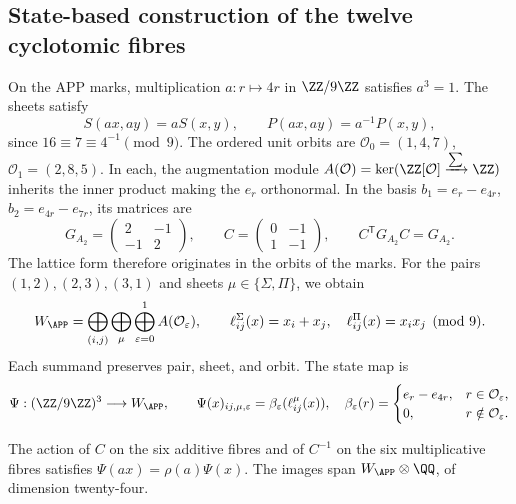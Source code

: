 \subsection{State-based construction of the twelve cyclotomic fibres}
\label{x_reciprocidad:nuclear:fibras-app-witt}
On the APP marks, multiplication \(a:r\mapsto4r\) in
\(\ZZ/9\ZZ\) satisfies \(a^3=1\). The sheets satisfy
\[
 S(ax,ay)=aS(x,y),\qquad P(ax,ay)=a^{-1}P(x,y),
\]
since \(16\equiv7\equiv4^{-1}\pmod9\). The ordered unit orbits
are \(\mathcal O_0=(1,4,7)\), \(\mathcal O_1=(2,8,5)\).
In each, the augmentation module
\(A(\mathcal O)=\ker(\ZZ[\mathcal O]\xrightarrow{\sum}\ZZ)\)
inherits the inner product making the \(e_r\) orthonormal. In the basis
\(b_1=e_r-e_{4r}\), \(b_2=e_{4r}-e_{7r}\), its matrices are
\[
 G_{A_2}=\begin{pmatrix}2&-1\\-1&2\end{pmatrix},\qquad
 C=\begin{pmatrix}0&-1\\1&-1\end{pmatrix},\qquad
 C^{\mathsf T}G_{A_2}C=G_{A_2}.
\]
The lattice form therefore originates in the orbits of the marks.
For the pairs \((1,2),(2,3),(3,1)\) and sheets
\(\mu\in\{\Sigma,\Pi\}\), we obtain
\[
 W_{\APP}=\bigoplus_{(i,j)}\bigoplus_\mu\bigoplus_{\varepsilon=0}^1
 A(\mathcal O_\varepsilon),\qquad
 \ell^\Sigma_{ij}(x)=x_i+x_j,\quad
 \ell^\Pi_{ij}(x)=x_ix_j\pmod9.
\]
Each summand preserves pair, sheet, and orbit. The state map is
\[
 \Psi:(\ZZ/9\ZZ)^3\longrightarrow W_{\APP},\qquad
 \Psi(x)_{ij,\mu,\varepsilon}=\beta_\varepsilon(\ell^\mu_{ij}(x)),
 \quad
 \beta_\varepsilon(r)=
 \begin{cases}e_r-e_{4r},&r\in\mathcal O_\varepsilon,\\0,&r\notin\mathcal O_\varepsilon.
 \end{cases}
\]
\begin{proposition}
\label{x_reciprocidad:nuclear:psi-rango}
The action of \(C\) on the six additive fibres and of \(C^{-1}\) on
the six multiplicative fibres satisfies \(\Psi(ax)=\rho(a)\Psi(x)\).
The images span \(W_{\APP}\otimes\QQ\), of dimension twenty-four.
\end{proposition}
